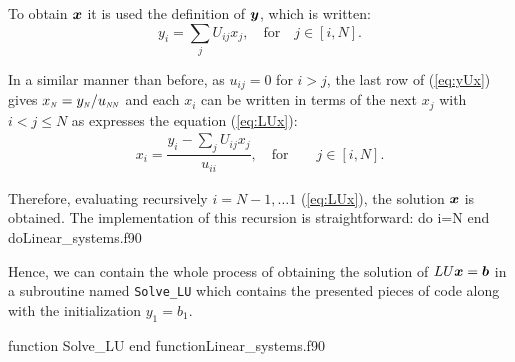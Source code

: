  To obtain $\boldsymbol{x}$ it is used the definition of $\boldsymbol{y}$, which is written:
 \begin{equation}
 y_i = \sum_{j} U_{ij} x_j ,  \quad \mbox{for} \quad j \in [i,N]. \label{eq:yUx}
 \end{equation}
 
 In a similar manner than before, as $u_{ij}=0$ for $i>j$, the last row of (\ref{eq:yUx}) gives $x_{\tiny \mbox{\textit{N}}}=y_{\tiny \mbox{\textit{N}}} / u_{\tiny \mbox{\textit{NN}}}$ and each $x_i$ can be written in terms of the next $x_j$ with $i<j\leq N$ as expresses the equation (\ref{eq:LUx}):
 \begin{align}
     x_i = \dfrac{y_i - \sum_{j} U_{ij}x_j}{ u_{ii}}, \quad \mbox{for} \quad \quad j \in [i,N]. \label{eq:LUx}
 \end{align} 
 
 Therefore, evaluating recursively $i = N-1, \ldots 1$
 (\ref{eq:LUx}), the solution $\boldsymbol{x}$ is obtained. The implementation of this recursion is straightforward:
 \vspace{0.5cm} 
 {do i=N}
 {end do}{Linear_systems.f90}
 
 Hence, we can contain the whole process of obtaining the solution of $LU\boldsymbol{x}=\boldsymbol{b}$ in a subroutine named \verb|Solve_LU| which contains the presented pieces of code along with the initialization $y_1=b_1$.
 
 \vspace{0.5cm} 
 {function Solve_LU}
 {end function}{Linear_systems.f90}
 
 
 
 
   
 \newpage   
 
